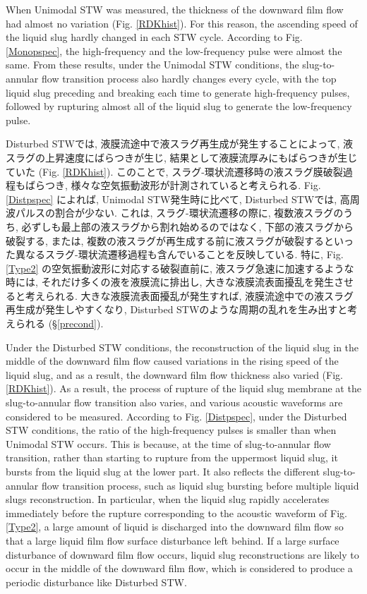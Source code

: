 \documentclass[12pt]{article}
\begin{document}
When Unimodal STW was measured, the thickness of the downward film flow had almost no variation (Fig. \ref{RDKhist}).
For this reason, the ascending speed of the liquid slug hardly changed in each STW cycle.
According to Fig. \ref{Monopspec}, the high-frequency and the low-frequency pulse were almost the same.
From these results, under the Unimodal STW conditions, the slug-to-annular flow transition process also hardly changes every cycle, with the top liquid slug preceding and breaking each time to generate high-frequency pulses, followed by rupturing almost all of the liquid slug to generate the low-frequency pulse.

Disturbed STWでは, 液膜流途中で液スラグ再生成が発生することによって, 液スラグの上昇速度にばらつきが生じ, 結果として液膜流厚みにもばらつきが生じていた (Fig. \ref{RDKhist}). 
このことで, スラグ-環状流遷移時の液スラグ膜破裂過程もばらつき, 様々な空気振動波形が計測されていると考えられる. 
Fig. \ref{Distpspec} によれば, Unimodal STW発生時に比べて, Disturbed STWでは, 高周波パルスの割合が少ない. 
これは, スラグ-環状流遷移の際に, 複数液スラグのうち, 必ずしも最上部の液スラグから割れ始めるのではなく, 下部の液スラグから破裂する, または, 複数の液スラグが再生成する前に液スラグが破裂するといった異なるスラグ-環状流遷移過程も含んでいることを反映している.
特に, Fig. \ref{Type2} の空気振動波形に対応する破裂直前に, 液スラグ急速に加速するような時には, それだけ多くの液を液膜流に排出し, 大きな液膜流表面擾乱を発生させると考えられる. 大きな液膜流表面擾乱が発生すれば, 液膜流途中での液スラグ再生成が発生しやすくなり, Disturbed STWのような周期の乱れを生み出すと考えられる (\S \ref{precond}). 

Under the Disturbed STW conditions, the reconstruction of the liquid slug in the middle of the downward film flow caused variations in the rising speed of the liquid slug, and as a result, the downward film flow thickness also varied (Fig. \ref{RDKhist}).
As a result, the process of rupture of the liquid slug membrane at the slug-to-annular flow transition also varies, and various acoustic waveforms are considered to be measured.
According to Fig. \ref{Distpspec}, under the Disturbed STW conditions, the ratio of the high-frequency pulses is smaller than when Unimodal STW occurs.
This is because, at the time of slug-to-annular flow transition, rather than starting to rupture from the uppermost liquid slug, it bursts from the liquid slug at the lower part.
It also reflects the different slug-to-annular flow transition process, such as liquid slug bursting before multiple liquid slugs reconstruction.
In particular, when the liquid slug rapidly accelerates immediately before the rupture corresponding to the acoustic waveform of Fig. \ref{Type2}, a large amount of liquid is discharged into the downward film flow so that a large liquid film flow surface disturbance left behind.
If a large surface disturbance of downward film flow occurs, liquid slug reconstructions are likely to occur in the middle of the downward film flow, which is considered to produce a periodic disturbance like Disturbed STW.
\end{document}
